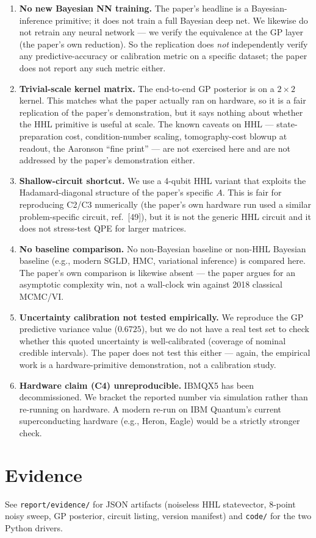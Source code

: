 \documentclass[11pt]{article}
\begin{document}
\begin{enumerate}
  \item \textbf{No new Bayesian NN training.} The paper's headline is a
    Bayesian-inference primitive; it does not train a full Bayesian
    deep net. We likewise do not retrain any neural network --- we
    verify the equivalence at the GP layer (the paper's own reduction).
    So the replication does \emph{not} independently verify any
    predictive-accuracy or calibration metric on a specific dataset;
    the paper does not report any such metric either.
  \item \textbf{Trivial-scale kernel matrix.} The end-to-end GP posterior
    is on a $2 \times 2$ kernel. This matches what the paper actually
    ran on hardware, so it is a fair replication of the paper's
    demonstration, but it says nothing about whether the HHL primitive
    is useful at scale. The known caveats on HHL --- state-preparation
    cost, condition-number scaling, tomography-cost blowup at readout,
    the Aaronson ``fine print'' --- are not exercised here and are
    not addressed by the paper's demonstration either.
  \item \textbf{Shallow-circuit shortcut.} We use a 4-qubit HHL variant
    that exploits the Hadamard-diagonal structure of the paper's
    specific $A$. This is fair for reproducing C2/C3 numerically (the
    paper's own hardware run used a similar problem-specific
    circuit, ref.~[49]), but it is not the generic HHL circuit and
    it does not stress-test QPE for larger matrices.
  \item \textbf{No baseline comparison.} No non-Bayesian baseline or
    non-HHL Bayesian baseline (e.g., modern SGLD, HMC, variational
    inference) is compared here. The paper's own comparison is
    likewise absent --- the paper argues for an asymptotic complexity
    win, not a wall-clock win against 2018 classical MCMC/VI.
  \item \textbf{Uncertainty calibration not tested empirically.} We
    reproduce the GP predictive variance value ($0.6725$), but we do
    not have a real test set to check whether this quoted uncertainty
    is well-calibrated (coverage of nominal credible intervals). The
    paper does not test this either --- again, the empirical work
    is a hardware-primitive demonstration, not a calibration study.
  \item \textbf{Hardware claim (C4) unreproducible.} IBMQX5 has been
    decommissioned. We bracket the reported number via simulation
    rather than re-running on hardware. A modern re-run on IBM
    Quantum's current superconducting hardware (e.g., Heron, Eagle)
    would be a strictly stronger check.
\end{enumerate}

\section{Evidence}
See \texttt{report/evidence/} for JSON artifacts (noiseless HHL
statevector, 8-point noisy sweep, GP posterior, circuit listing,
version manifest) and \texttt{code/} for the two Python drivers.
\end{document}
